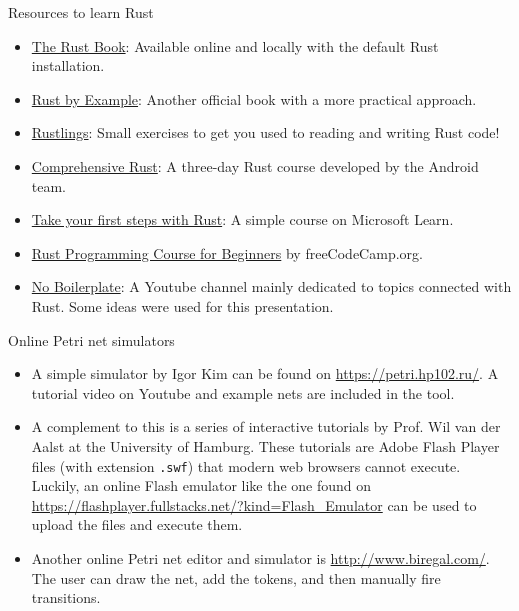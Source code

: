 \documentclass{beamer}
\begin{document}
\begin{frame}{Resources to learn Rust}
  \begin{itemize}
    \item \href{https://doc.rust-lang.org/stable/book/}{The Rust Book}:
          Available online and locally with the default Rust installation.
    \item \href{https://doc.rust-lang.org/rust-by-example/}{Rust by Example}:
          Another official book with a more practical approach.
    \item \href{https://github.com/rust-lang/rustlings}{Rustlings}:
          Small exercises to get you used to reading and writing Rust code! 
    \item \href{https://google.github.io/comprehensive-rust/}{Comprehensive Rust}:
          A three-day Rust course developed by the Android team.
    \item \href{https://learn.microsoft.com/en-us/training/paths/rust-first-steps/}{Take your first steps with Rust}:
          A simple course on Microsoft Learn.
    \item \href{https://www.youtube.com/watch?v=MsocPEZBd-M}{Rust Programming Course for Beginners} by freeCodeCamp.org.
    \item \href{https://www.youtube.com/\@NoBoilerplate/videos}{No Boilerplate}:
          A Youtube channel mainly dedicated to topics connected with Rust. Some ideas were used for this presentation.
  \end{itemize}
\end{frame}

\begin{frame}{Online Petri net simulators}
  \begin{itemize}
    \item A simple simulator by Igor Kim can be found on \url{https://petri.hp102.ru/}.
          A tutorial video on Youtube and example nets are included in the tool.
    \item A complement to this is a series of interactive tutorials by Prof. Wil van der Aalst
          at the University of Hamburg. These tutorials are Adobe Flash Player files (with extension \texttt{.swf})
          that modern web browsers cannot execute.
          Luckily, an online Flash emulator like the one found on \url{https://flashplayer.fullstacks.net/?kind=Flash_Emulator}
          can be used to upload the files and execute them.
    \item Another online Petri net editor and simulator is \url{http://www.biregal.com/}.
          The user can draw the net, add the tokens, and then manually fire transitions.
  \end{itemize}
\end{frame}
\end{document}
